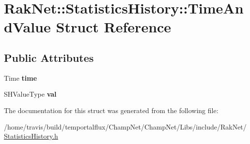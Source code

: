 \hypertarget{struct_rak_net_1_1_statistics_history_1_1_time_and_value}{\section{Rak\-Net\-:\-:Statistics\-History\-:\-:Time\-And\-Value Struct Reference}
\label{struct_rak_net_1_1_statistics_history_1_1_time_and_value}
}
\subsection*{Public Attributes}
\begin{DoxyCompactItemize}
\item 
\hypertarget{struct_rak_net_1_1_statistics_history_1_1_time_and_value_ac2a33cded7686c0495c5136847905ded}{Time {\bfseries time}}\label{struct_rak_net_1_1_statistics_history_1_1_time_and_value_ac2a33cded7686c0495c5136847905ded}

\item 
\hypertarget{struct_rak_net_1_1_statistics_history_1_1_time_and_value_a20c8c386f3ef7d050e13f61d45bc4f9f}{S\-H\-Value\-Type {\bfseries val}}\label{struct_rak_net_1_1_statistics_history_1_1_time_and_value_a20c8c386f3ef7d050e13f61d45bc4f9f}

\end{DoxyCompactItemize}


The documentation for this struct was generated from the following file\-:\begin{DoxyCompactItemize}
\item 
/home/travis/build/temportalflux/\-Champ\-Net/\-Champ\-Net/\-Libs/include/\-Rak\-Net/\hyperlink{_statistics_history_8h}{Statistics\-History.\-h}\end{DoxyCompactItemize}

